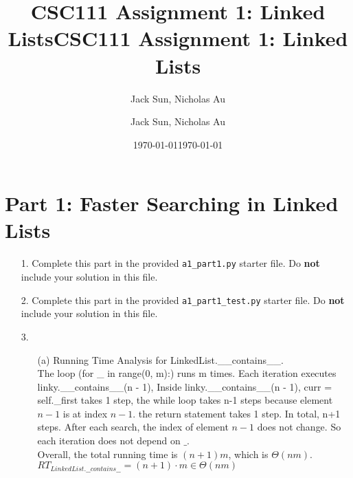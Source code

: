 \documentclass[fontsize=11pt]{article}
\title{CSC111 Assignment 1: Linked Lists}
\author{Jack Sun, Nicholas Au}
\date{\today}
\title{CSC111 Assignment 1: Linked Lists}
\author{Jack Sun, Nicholas Au}
\date{\today}
\begin{document}
\maketitle

\section*{Part 1: Faster Searching in Linked Lists}

\begin{enumerate}

\item[1.]
Complete this part in the provided \texttt{a1\_part1.py} starter file.
Do \textbf{not} include your solution in this file.

\item[2.]
Complete this part in the provided \texttt{a1\_part1\_test.py} starter file.
Do \textbf{not} include your solution in this file.

\item[3.]
\begin{enumerate}

    \item[(a)]
Running Time Analysis for LinkedList.\_\_contains\_\_.
\\The loop (for \_ in range(0, m):) runs m times. Each iteration executes linky.\_\_contains\_\_(n - 1), Inside linky.\_\_contains\_\_(n - 1), curr = self.\_first takes 1 step, the while loop takes n-1 steps because element $n-1$ is at index $n-1$. the return statement takes 1 step. In total, n+1 steps. After each search, the index of element $n-1$ does not change. So each iteration does not depend on $\_$.
\\ Overall, the total running time is $(n+1)m$, which is $\Theta(nm)$.$RT_{LinkedList.\_\_contains\_\_}=(n+1)\cdot m\in \Theta(nm)$


\end{enumerate}
\end{enumerate}
\end{document}
